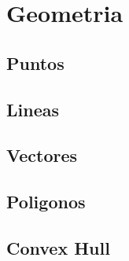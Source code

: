 \section{Geometria}
\subsection{Puntos}
\raggedbottom
\hrulefill
\subsection{Lineas}
\raggedbottom
\hrulefill
\subsection{Vectores}
\raggedbottom
\hrulefill
\subsection{Poligonos}
\raggedbottom
\hrulefill
\subsection{Convex Hull}
\raggedbottom
\hrulefill

